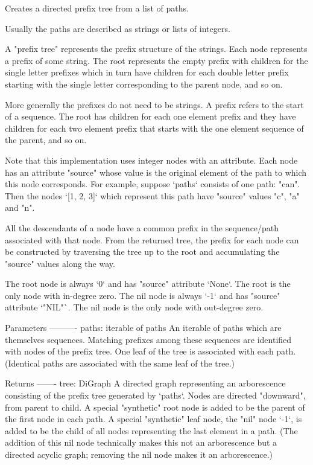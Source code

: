 \begin{DoxyVerb}Creates a directed prefix tree from a list of paths.

Usually the paths are described as strings or lists of integers.

A "prefix tree" represents the prefix structure of the strings.
Each node represents a prefix of some string. The root represents
the empty prefix with children for the single letter prefixes which
in turn have children for each double letter prefix starting with
the single letter corresponding to the parent node, and so on.

More generally the prefixes do not need to be strings. A prefix refers
to the start of a sequence. The root has children for each one element
prefix and they have children for each two element prefix that starts
with the one element sequence of the parent, and so on.

Note that this implementation uses integer nodes with an attribute.
Each node has an attribute "source" whose value is the original element
of the path to which this node corresponds. For example, suppose `paths`
consists of one path: "can". Then the nodes `[1, 2, 3]` which represent
this path have "source" values "c", "a" and "n".

All the descendants of a node have a common prefix in the sequence/path
associated with that node. From the returned tree, the prefix for each
node can be constructed by traversing the tree up to the root and
accumulating the "source" values along the way.

The root node is always `0` and has "source" attribute `None`.
The root is the only node with in-degree zero.
The nil node is always `-1` and has "source" attribute `"NIL"`.
The nil node is the only node with out-degree zero.


Parameters
----------
paths: iterable of paths
    An iterable of paths which are themselves sequences.
    Matching prefixes among these sequences are identified with
    nodes of the prefix tree. One leaf of the tree is associated
    with each path. (Identical paths are associated with the same
    leaf of the tree.)


Returns
-------
tree: DiGraph
    A directed graph representing an arborescence consisting of the
    prefix tree generated by `paths`. Nodes are directed "downward",
    from parent to child. A special "synthetic" root node is added
    to be the parent of the first node in each path. A special
    "synthetic" leaf node, the "nil" node `-1`, is added to be the child
    of all nodes representing the last element in a path. (The
    addition of this nil node technically makes this not an
    arborescence but a directed acyclic graph; removing the nil node
    makes it an arborescence.)



\end{DoxyVerb}
